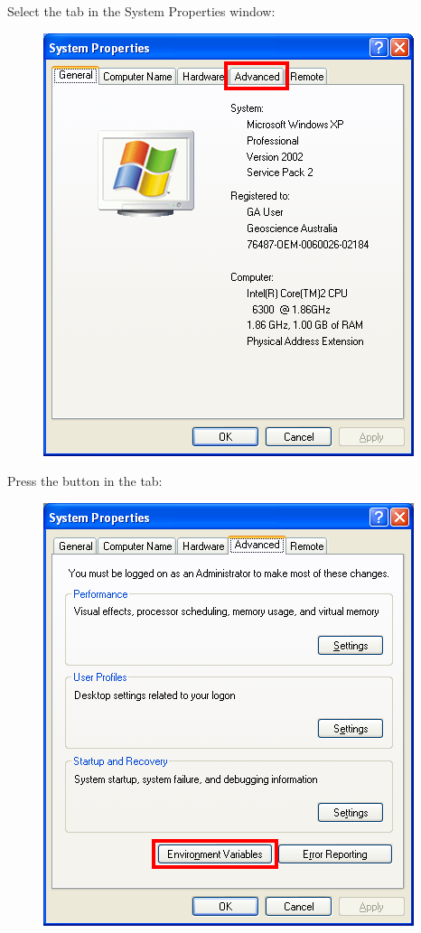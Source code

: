 \documentclass{manual}
\begin{document}
\pagebreak

Select the  tab in the System Properties window:
\begin{figure}[ht]
  \centerline{\includegraphics[scale=0.5]{installgraphics/winsetpath3.png}}
  \label{fig:winsetpath3}
\end{figure}


Press the  button in the  tab:
\begin{figure}[ht]
  \centerline{\includegraphics[scale=0.5]{installgraphics/winsetpath4.png}}
  \label{fig:winsetpath4}
\end{figure}
\end{document}
